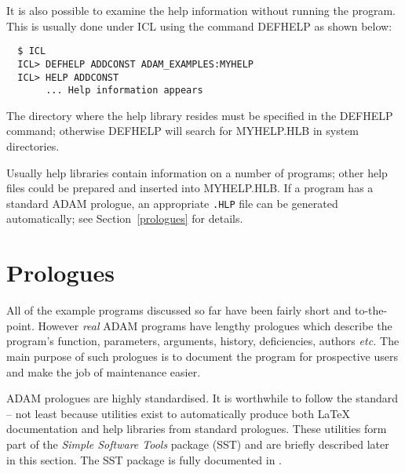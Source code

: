 It is also possible to examine the help information without running the 
program. This is usually done under ICL using the command DEFHELP as 
shown below:
\begin{verbatim}
  $ ICL
  ICL> DEFHELP ADDCONST ADAM_EXAMPLES:MYHELP   
  ICL> HELP ADDCONST
       ... Help information appears
\end{verbatim}
The directory where the help library resides must be specified in the
DEFHELP command; otherwise 
DEFHELP will search for MYHELP.HLB in system directories.

Usually help libraries contain information on a number of programs;
other help files could be prepared and inserted into MYHELP.HLB.
If a program has a standard ADAM prologue, 
an appropriate {\tt .HLP} file can be generated automatically; see 
Section~\ref{prologues} for details.

\newpage
\section{Prologues\label{prologues}}

All of the example programs discussed so far have been fairly short and 
to-the-point.
However {\sl real\/} ADAM programs have lengthy prologues which describe
the program's function, parameters, arguments, history, deficiencies, authors 
{\it etc.}
The main purpose of such prologues is to document the program for 
prospective users and make the job of maintenance easier.

ADAM prologues are highly standardised. It is worthwhile to follow the
standard -- 
not least because utilities exist to automatically produce
both {\LaTeX} documentation and help libraries from standard prologues. 
These utilities form part
of the {\sl Simple Software Tools\/} package  (SST) and are briefly described 
later in this section. The SST package is fully documented in
. 

